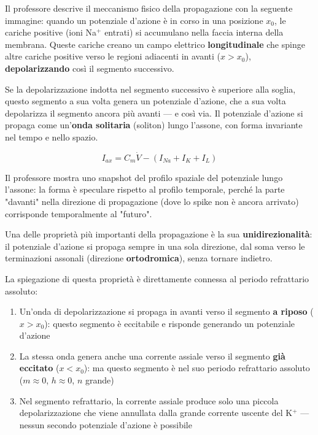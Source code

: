 Il professore descrive il meccanismo fisico della propagazione con la seguente immagine: quando un potenziale d'azione è in corso in una posizione $x_0$, le cariche positive (ioni Na$^+$ entrati) si accumulano nella faccia interna della membrana. Queste cariche creano un campo elettrico \textbf{longitudinale} che spinge altre cariche positive verso le regioni adiacenti in avanti ($x > x_0$), \textbf{depolarizzando} così il segmento successivo.

Se la depolarizzazione indotta nel segmento successivo è superiore alla soglia, questo segmento a sua volta genera un potenziale d'azione, che a sua volta depolarizza il segmento ancora più avanti — e così via. Il potenziale d'azione si propaga come un'\textbf{onda solitaria} (soliton) lungo l'assone, con forma invariante nel tempo e nello spazio.

\begin{equation}
I_{ax} = C_m \dot{V} - (I_{Na} + I_K + I_L)
\end{equation}

Il professore mostra uno snapshot del profilo spaziale del potenziale lungo l'assone: la forma è speculare rispetto al profilo temporale, perché la parte "davanti" nella direzione di propagazione (dove lo spike non è ancora arrivato) corrisponde temporalmente al "futuro".



Una delle proprietà più importanti della propagazione è la sua \textbf{unidirezionalità}: il potenziale d'azione si propaga sempre in una sola direzione, dal soma verso le terminazioni assonali (direzione \textbf{ortodromica}), senza tornare indietro.

La spiegazione di questa proprietà è direttamente connessa al periodo refrattario assoluto:

\begin{enumerate}
    \item Un'onda di depolarizzazione si propaga in avanti verso il segmento \textbf{a riposo} ($x > x_0$): questo segmento è eccitabile e risponde generando un potenziale d'azione
    \item La stessa onda genera anche una corrente assiale verso il segmento \textbf{già eccitato} ($x < x_0$): ma questo segmento è nel suo periodo refrattario assoluto ($m \approx 0$, $h \approx 0$, $n$ grande)
    \item Nel segmento refrattario, la corrente assiale produce solo una piccola depolarizzazione che viene annullata dalla grande corrente uscente del K$^+$ — nessun secondo potenziale d'azione è possibile
\end{enumerate}

